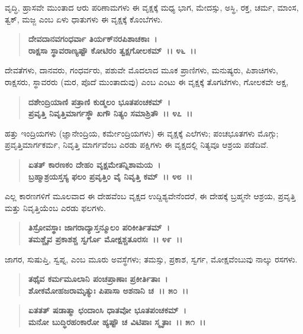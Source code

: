 ವೃದ್ಧಿ, ಹ್ರಾಸವೇ ಮುಂತಾದ ಆರು ಪರಿಣಾಮಗಳು ಈ ವೃಕ್ಷಕ್ಕೆ ಮಧ್ಯ ಭಾಗ, ಮೇದಸ್ಸು, ಅಸ್ಥಿ, ರಕ್ತ, ಚರ್ಮ, ಮಾಂಸ, ತ್ವಕ್, ಮಜ್ಜ ಎಂಬ ಏಳು ಧಾತುಗಳು ಈ ವೃಕ್ಷಕ್ಕೆ ಕೊಂಬೆಗಳು.

\begin{verse}
\textbf{ದೇವದಾನವಗಂಧರ್ವಾ ತಿರ್ಯಕ್‌ನರಪಿಶಾಚಕಾಃ~।}\\\textbf{ರಾಕ್ಷಸಾ ಸ್ಥಾವರಾಣ್ಯಷ್ಟೌ ಕೋಟಿರಂ ತ್ವಕ್ಷಗೋಲಕಮ್~।। ೪೬~।।}
\end{verse}

ದೇವತೆಗಳು, ದಾನವರು, ಗಂಧರ್ವರು, ಪಶುವೇ ಮೊದಲಾದ ಮೂಕ ಪ್ರಾಣಿಗಳು, ಮನುಷ್ಯರು, ಪಿಶಾಚಿಗಳು, ರಾಕ್ಷಸರು, ಸ್ಥಾವರರು (ಮರ, ಪೊದೆ ಮುಂತಾದುವು) ಎಂಬ ಎಂಟು ಈ ವೃಕ್ಷಕ್ಕೆ ತೊಗಟೆಗಳು, ಗೋಲಕವೇ ಅಕ್ಷ,

\begin{verse}
\textbf{ದಶೇಂದ್ರಿಯಾಣಿ ಪತ್ರಾಣಿ ಕುಡ್ಮಲಂ ಭೂತಪಂಚಕಮ್~।}\\\textbf{ಪ್ರವೃತ್ತಿ ನಿವೃತ್ತಿಮಾರ್ಗಸ್ಥೌ ಖಗೌ ನಿತ್ಯಂ ಸಮಾಶ್ರಿತೌ~।। ೪೭~।।}
\end{verse}

ಹತ್ತು ಇಂದ್ರಿಯಗಳು (ಜ್ಞಾನೇಂದ್ರಿಯ, ಕರ್ಮೇಂದ್ರಿಯಗಳು) ಈ ವೃಕ್ಷಕ್ಕೆ ಎಲೆಗಳು; ಪಂಚಭೂತಗಳು ಮೊಗ್ಗು; ಪ್ರವೃತ್ತಿಮಾರ್ಗಕರ್ಮ, ನಿವೃತ್ತಿ ಮಾರ್ಗವೆಂಬ ಎರಡು ಪಕ್ಷಿಗಳು ಈ ವೃಕ್ಷದಲ್ಲಿ ನಿತ್ಯವೂ ಆಶ್ರಯ ಪಡೆದಿವೆ.

\begin{verse}
\textbf{ಏತತ್ ಕಾರಣಕಂ ದೇಹಂ ವೃಕ್ಷಮೇತನ್ನಿಶಾಮಯ~।}\\\textbf{ಬ್ರಹ್ಮಾಶ್ರಯಸ್ತಸ್ಯ ಫಲಂ ಪ್ರವೃತ್ತಿಂ ವೈ ನಿವೃತ್ತಿ ಕಮ್~।। ೪೮~।।}
\end{verse}

ಎಲ್ಲ ಕಾರಣಗಳಿಗೆ ಮೂಲವಾದ ಈ ದೇಹವೆಂಬ ವೃಕ್ಷದ ಉದ್ದಿಶ್ಯವೇನೆಂದರೆ, ಈ ದೇಹಕ್ಕೆ ಬ್ರಹ್ಮನೇ ಆಶ್ರಯ, ಪ್ರವೃತ್ತಿ ಮತ್ತು ನಿವೃತ್ತಿಯೆಂಬ ಎರಡು ಫಲಗಳು.

\begin{verse}
\textbf{ತಿಸ್ರೋವಸ್ಥಾಃ ಜಾಗರಾದ್ಯಾಸ್ತನ್ಮೂಲಂ ಪರಿಕೀರ್ತಿತಮ್~।}\\\textbf{ತಮಶ್ಚೈವ ಪ್ರಕಾಶಶ್ಚ ಸ್ವರ್ಗೊ ಮೋಕ್ಷಶ್ಚತೂರಸಃ~।। ೪೯~।।}
\end{verse}

ಜಾಗರ, ಸುಷುಪ್ತಿ, ಸ್ವಪ್ನ, ಎಂಬ ಮೂರು ಅವಸ್ಥೆಗಳು; ತಮಸ್ಸು, ಪ್ರಕಾಶ, ಸ್ವರ್ಗ, ಮೋಕ್ಷವೆಂಬುವು ನಾಲ್ಕು ರಸಗಳು.

\begin{verse}
\textbf{ತಥೈವ ಕರ್ಮಮೂಲಾನಿ ಪಂಚಪ್ರಾಣಾಃ ಪ್ರಕೀರ್ತಿತಾಃ~।}\\\textbf{ಶೋಕಮೋಹಜರಾಮೃತ್ಯುಃ ಪಿಪಾಸಾ ಅಶನಾನಿ ಚ~।। ೫೦~।।}
\end{verse}

\begin{verse}
\textbf{ಏತತತ್ ಷಡಾತ್ಮಾ ಛಂದಾಂಸಿ ಧಾತವೋ ಭೂತಪಂಚಕಮ್~।}\\\textbf{ಮನೋ ಬುದ್ಧಿರಹಂಕಾರೋ ಹ್ಯಷ್ಟೌ ಚ ವಿಟಿಪಾಃ ಸ್ಮೃತಾಃ~।। ೫೧~।।}
\end{verse}

